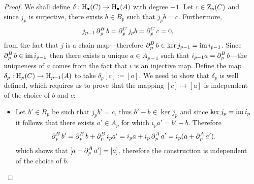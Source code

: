 \begin{proof}
    We shall define \(\delta: \operatorname{H}_\bullet(C) \to \operatorname{H}_{\bullet}(A)\) with degree
    \(-1\). Let \(c \in \operatorname{Z}_p(C)\) and since \(j_p\) is surjective, there exists
    \(b \in B_p\) such that \(j_p b = c\). Furthermore,
    \[
        j_{p-1} \operatorname{\partial}_p^B b = \operatorname{\partial}_p^C j_p b = \operatorname{\partial}_p^C c = 0,
    \]
    from the fact that \(j\) is a chain map---therefore
    \(\operatorname{\partial}_p^B b \in \ker j_{p-1} = \operatorname{im} i_{p-1}\). Since
    \(\operatorname{\partial}_p^B b \in \operatorname{im} i_{p-1}\) then there exists a unique \(a \in A_{p-1}\) such
    that \(i_{p-1} a = \operatorname{\partial}_p^B b\)---the uniqueness of \(a\) comes from the fact
    that \(i\) is an injective map. Define the map
    \(\delta_p: \operatorname{H}_p(C) \to \operatorname{H}_{p-1}(A)\) to take
    \(\delta_p[c] \coloneq [a]\). We need to show that \(\delta_p\) is well defined, which requires
    us to prove that the mapping \([c] \mapsto [a]\) is independent of the choice of
    \(b\) and \(c\):
    \begin{itemize}\setlength\itemsep{0em}
        \item Let \(b' \in B_p\) be such that \(j_p b' = c\), thus \(b' - b \in \ker j_p\)
              and since \(\ker j_p = \operatorname{im} i_p\) it follows that there exists \(a' \in A_p\) for
              which \(i_p a' = b' - b\). Therefore
              \[
                  \operatorname{\partial}_p^B b'
                  = \operatorname{\partial}_p^B b + \operatorname{\partial}_p^B i_p a'
                  = i_p a + i_p \operatorname{\partial}_p^A a'
                  = i_p(a + \operatorname{\partial}_p^A a'),
              \]
              which shows that \([a + \operatorname{\partial}_p^A a'] = [a]\), therefore the construction is
              independent of the choice of \(b\).


\end{itemize}
\end{proof}
